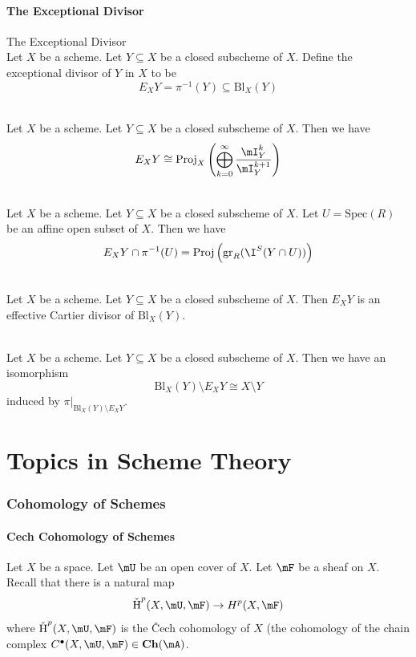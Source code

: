 \documentclass[a4paper]{article}
\begin{document}
\subsection{The Exceptional Divisor}
\begin{defn}{The Exceptional Divisor}{}\\
Let $X$ be a scheme. Let $Y\subseteq X$ be a closed subscheme of $X$. Define the exceptional divisor of $Y$ in $X$ to be $$E_XY=\pi^{-1}(Y)\subseteq\text{Bl}_X(Y)$$
\end{defn}

\begin{lmm}{}{}\\
Let $X$ be a scheme. Let $Y\subseteq X$ be a closed subscheme of $X$. Then we have $$E_XY\cong\text{Proj}_X\left(\bigoplus_{k=0}^\infty\frac{\mI_Y^k}{\mI_Y^{k+1}}\right)$$
\end{lmm}

\begin{lmm}{}{}\\
Let $X$ be a scheme. Let $Y\subseteq X$ be a closed subscheme of $X$. Let $U=\text{Spec}(R)$ be an affine open subset of $X$. Then we have $$E_XY\cap\pi^{-1}(U)=\text{Proj}\left(\text{gr}_R(\I^S(Y\cap U))\right)$$
\end{lmm}

\begin{prp}{}{}\\
Let $X$ be a scheme. Let $Y\subseteq X$ be a closed subscheme of $X$. Then $E_XY$ is an effective Cartier divisor of $\text{Bl}_X(Y)$. 
\end{prp}

\begin{prp}{}{}\\
Let $X$ be a scheme. Let $Y\subseteq X$ be a closed subscheme of $X$. Then we have an isomorphism $$\text{Bl}_X(Y)\setminus E_XY\cong X\setminus Y$$ induced by $\pi|_{\text{Bl}_X(Y)\setminus E_XY}$. 
\end{prp}

\pagebreak

\part{Topics in Scheme Theory}

\pagebreak
\section{Cohomology of Schemes}
\subsection{Cech Cohomology of Schemes}
Let $X$ be a space. Let $\mU$ be an open cover of $X$. Let $\mF$ be a sheaf on $X$. Recall that there is a natural map $$\text{\v{H}}^p(X,\mU,\mF)\to H^p(X,\mF)$$ where $\text{\v{H}}^p(X,\mU,\mF)$ is the \v{C}ech cohomology of $X$ (the cohomology of the chain complex $C^\bullet(X,\mU,\mF)\in\bold{Ch}(\mA)$. 
\end{document}
